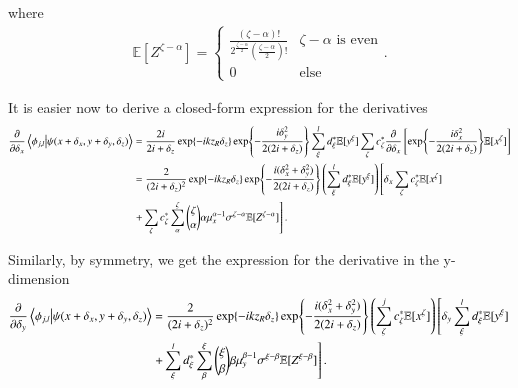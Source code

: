 \documentclass[reprint,amsmath,amssymb,aps,pra,floatfix]{revtex4-2}
\begin{document}
where
\begin{align}
    \mathbb{E}[Z^{\zeta-\alpha}] = \begin{cases}
        \frac{(\zeta-\alpha)!}{2^{\frac{\zeta-\alpha}{2}} (\frac{\zeta-\alpha}{2})!} & \zeta-\alpha \text{ is even} \\
        0 & \text{else}
    \end{cases}.
\end{align}

It is easier now to derive a closed-form expression for the derivatives
\begin{align}
    \frac{\partial}{\partial \delta_x} \braket{\phi_{j,l}}{\psi(x+\delta_x,y+\delta_y,\delta_z)} &= \frac{2i}{2i + \delta_z}  \exp{-ikz_R\delta_z} \exp{-\frac{i \delta_y^2}{2(2i +\delta_z)}} \sum_\xi^l d^*_\xi \mathbb{E}[y^\xi]\sum_\zeta c^*_\zeta  \frac{\partial}{\partial \delta_x} \left [ \exp{-\frac{i\delta_x^2}{2(2i +\delta_z)}}\mathbb{E}[x^\zeta] \right ] \nonumber \\
    &=  \frac{2}{(2i + \delta_z)^2}  \exp{-ikz_R\delta_z} \exp{-\frac{i (\delta_x^2 + \delta_y^2)}{2(2i +\delta_z)}} \left ( \sum_\xi^l d^*_\xi \mathbb{E}[y^\xi] \right ) \left [ \delta_x \sum_\zeta c^*_\zeta \mathbb{E}[x^\zeta] \right. \nonumber \\
    & \left. + \sum_\zeta c^*_\zeta \sum^\zeta_\alpha \binom{\zeta}{\alpha} \alpha \mu_x^{\alpha-1} \sigma^{\zeta-\alpha}  \mathbb{E}[Z^{\zeta-\alpha}] \right ].
\end{align}

Similarly, by symmetry, we get the expression for the derivative in the y-dimension
\begin{align}
    \frac{\partial}{\partial \delta_y} \braket{\phi_{j,l}}{\psi(x+\delta_x,y+\delta_y,\delta_z)} &=  \frac{2}{(2i + \delta_z)^2}  \exp{-ikz_R\delta_z} \exp{-\frac{i (\delta_x^2 + \delta_y^2)}{2(2i +\delta_z)}} \left ( \sum_\zeta^j c^*_\zeta \mathbb{E}[x^\zeta] \right ) \left [ \delta_y \sum_\xi^l d^*_\xi \mathbb{E}[y^\xi] \right. \nonumber \\
    & \left. + \sum_\xi^l d^*_\xi \sum_\beta^\xi \binom{\xi}{\beta} \beta \mu_y^{\beta-1} \sigma^{\xi-\beta}  \mathbb{E}[Z^{\xi-\beta}] \right ].
\end{align}
\end{document}
